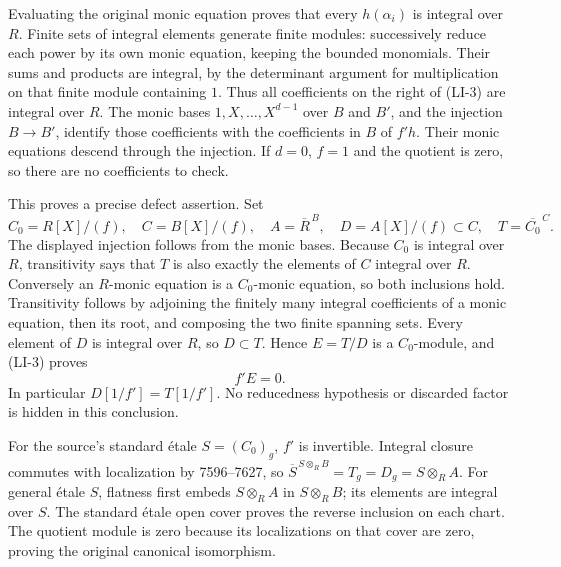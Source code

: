 Evaluating the original monic equation proves that every \(h(\alpha_i)\) is integral over \(R\). Finite sets of integral elements generate finite modules: successively reduce each power by its own monic equation, keeping the bounded monomials. Their sums and products are integral, by the determinant argument for multiplication on that finite module containing \(1\). Thus all coefficients on the right of (LI-3) are integral over \(R\). The monic bases \(1,X,\ldots,X^{d-1}\) over \(B\) and \(B'\), and the injection \(B\to B'\), identify those coefficients with the coefficients in \(B\) of \(f'h\). Their monic equations descend through the injection. If \(d=0\), \(f=1\) and the quotient is zero, so there are no coefficients to check.

This proves a precise defect assertion. Set \[
C_0=R[X]/(f),\quad C=B[X]/(f),\quad
A=\overline R^{\,B},\quad D=A[X]/(f)\subset C,\quad
T=\overline {C_0}^{\,C}.
\] The displayed injection follows from the monic bases. Because \(C_0\) is integral over \(R\), transitivity says that \(T\) is also exactly the elements of \(C\) integral over \(R\). Conversely an \(R\)-monic equation is a \(C_0\)-monic equation, so both inclusions hold. Transitivity follows by adjoining the finitely many integral coefficients of a monic equation, then its root, and composing the two finite spanning sets. Every element of \(D\) is integral over \(R\), so \(D\subset T\). Hence \(E=T/D\) is a \(C_0\)-module, and (LI-3) proves \[
f'E=0.
\tag{LI-4}
\] In particular \(D[1/f']=T[1/f']\). No reducedness hypothesis or discarded factor is hidden in this conclusion.

For the source's standard étale \(S=(C_0)_g\), \(f'\) is invertible. Integral closure commutes with localization by 7596--7627, so \(\overline S^{\,S\otimes_RB}=T_g=D_g=S\otimes_RA\). For general étale \(S\), flatness first embeds \(S\otimes_RA\) in \(S\otimes_RB\); its elements are integral over \(S\). The standard étale open cover proves the reverse inclusion on each chart. The quotient module is zero because its localizations on that cover are zero, proving the original canonical isomorphism.

